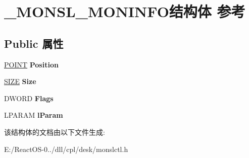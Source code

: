 \hypertarget{struct___m_o_n_s_l___m_o_n_i_n_f_o}{}\section{\+\_\+\+M\+O\+N\+S\+L\+\_\+\+M\+O\+N\+I\+N\+F\+O结构体 参考}
\label{struct___m_o_n_s_l___m_o_n_i_n_f_o}
\subsection*{Public 属性}
\begin{DoxyCompactItemize}
\item 
\mbox{\label{struct___m_o_n_s_l___m_o_n_i_n_f_o_aab89687423f3a84c2d9c44c70644457f}} 
\hyperlink{structtag_p_o_i_n_t}{P\+O\+I\+NT} {\bfseries Position}
\item 
\mbox{\label{struct___m_o_n_s_l___m_o_n_i_n_f_o_a572d381bdc17dcf6cd9a6e8443ba33d3}} 
\hyperlink{structtag_s_i_z_e}{S\+I\+ZE} {\bfseries Size}
\item 
\mbox{\label{struct___m_o_n_s_l___m_o_n_i_n_f_o_a6beae37c8458d110ac11bd9b7e896e32}} 
D\+W\+O\+RD {\bfseries Flags}
\item 
\mbox{\label{struct___m_o_n_s_l___m_o_n_i_n_f_o_a7484e58fe2479b635060358f3dfb3850}} 
L\+P\+A\+R\+AM {\bfseries l\+Param}
\end{DoxyCompactItemize}


该结构体的文档由以下文件生成\+:\begin{DoxyCompactItemize}
\item 
E\+:/\+React\+O\+S-\/0../dll/cpl/desk/monslctl.\+h\end{DoxyCompactItemize}

